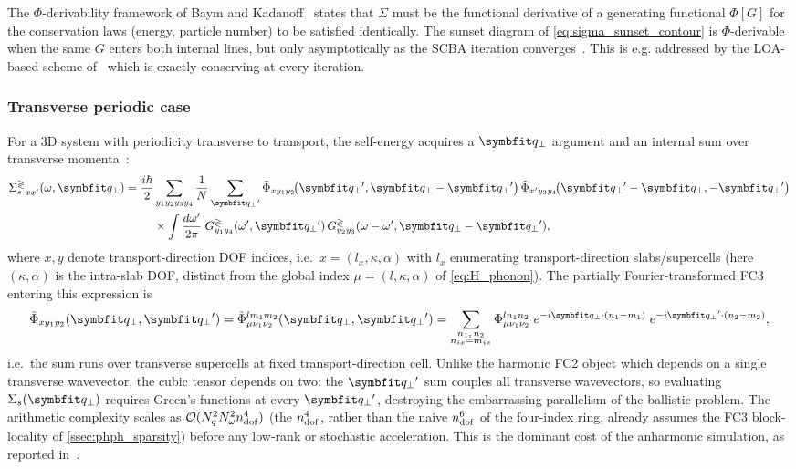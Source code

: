 The $\Phi$-derivability framework of Baym and Kadanoff~\cite{baym_conservation_1961, baym_self-consistent_1962}
states that $\Sigma$ must be the functional derivative of a generating
functional $\Phi[G]$ for the conservation laws (energy, particle number)
to be satisfied identically. The sunset diagram of
\cref{eq:sigma_sunset_contour} is $\Phi$-derivable when the same
$G$ enters both internal lines, but only asymptotically as the
SCBA iteration converges~\cite{lee_anharmonic_2018}. This is e.g. addressed by
the LOA-based scheme of~\citet{lee_anharmonic_2018}
which is exactly conserving at every iteration.

\subsubsection{Transverse periodic case}

For a 3D system with periodicity transverse to transport, the
self-energy acquires a $\qp$ argument and an internal sum over
transverse momenta~\cite{guo_quantum_2020}:
\begin{align}\label{eq:sigma_phph}
  \sse{\gtrless}_{x x'}(\omega,\qp)
  = \frac{i\hbar}{2}
    &\sum_{y_1 y_2 y_3 y_4}
    \frac{1}{N}\sum_{\qp{}'}
    \tilde{\Phi}_{x y_1 y_2}\!\bigl(\qp{}',\qp - \qp{}'\bigr)\,
    \tilde{\Phi}_{x' y_3 y_4}\!\bigl(\qp{}'-\qp,-\qp{}'\bigr)
    \notag\\
  &\times
    \int\!\dw\;
    G^{\gtrless}_{y_1 y_4}(\omega',\qp{}')\,
    G^{\gtrless}_{y_2 y_3}(\omega-\omega',\qp - \qp{}'),
\end{align}
where $x,y$ denote transport-direction DOF indices, i.e.\ $x=(l_x,\kappa,\alpha)$
with $l_x$ enumerating transport-direction slabs/supercells (here $(\kappa,\alpha)$
is the intra-slab DOF, distinct from the global index $\mu=(l,\kappa,\alpha)$ of
\cref{eq:H_phonon}). The
partially Fourier-transformed FC3 entering this expression is
\begin{align}\label{eq:fc3_fourier}
  \tilde{\Phi}_{x y_1 y_2}(\qp,\qp{}')
  = \tilde{\Phi}^{l m_1 m_2}_{\mu \nu_1 \nu_2}(\qp,\qp{}')
  = \sum_{\substack{n_1,\,n_2\\ n_{ix}=m_{ix}}}
    \Phi^{l n_1 n_2}_{\mu \nu_1 \nu_2}\;
    e^{-i\qp\cdot (n_1 - m_1)}\;
    e^{-i\qp{}'\cdot (n_2 - m_2)},
\end{align}
i.e.\ the sum runs over transverse supercells at fixed transport-direction
cell. Unlike the harmonic FC2 object which depends on a single
transverse wavevector, the cubic tensor depends on two: the
$\qp{}'$ sum couples all transverse wavevectors, so evaluating
$\Sigma_s(\qp)$ requires Green's functions at every $\qp{}'$, destroying
the embarrassing parallelism of the ballistic problem. The arithmetic
complexity scales as $\mathcal{O}(N_q^2 N_\omega^2 n_{\mathrm{dof}}^4)$
(the $n_{\mathrm{dof}}^4$, rather than the naive $n_{\mathrm{dof}}^6$ of the
four-index ring, already assumes the FC3 block-locality of
\cref{ssec:phph_sparsity})
before any low-rank or stochastic acceleration. This is the dominant
cost of the anharmonic simulation, as reported in~\cite{luisier_atomistic_2012,guo_quantum_2020, lee_anharmonic_2018}.

